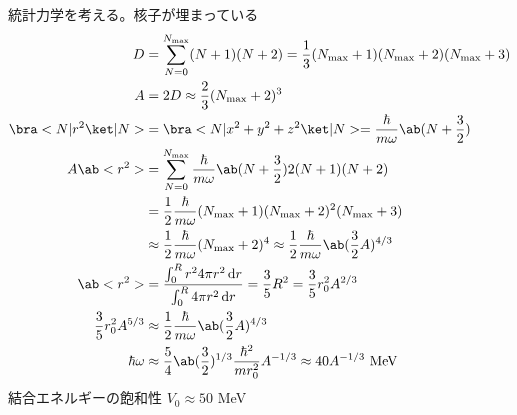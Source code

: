 \documentclass[uplatex,dvipdfmx,a4paper,11pt]{jlreq}
\numberwithin{equation}{section}
\theoremstyle{definition}
\begin{document}
統計力学を考える。核子が埋まっている
\begin{align}
  D                       & = \sum_{N = 0}^{N_{\max}}(N + 1)(N + 2) = \frac{1}{3}(N_{\max} + 1)(N_{\max} + 2)(N_{\max} + 3)                         \\
  A                       & = 2D \approx \frac{2}{3}(N_{\max} + 2)^3                                                                                \\
  \bra<N|r^2\ket|N>       & = \bra<N|x^2 + y^2 + z^2\ket|N> = \frac{\hbar}{m\omega}\ab(N + \frac{3}{2})                                             \\
  A\ab<r^2>               & = \sum_{N = 0}^{N_{\max}}\frac{\hbar}{m\omega}\ab(N + \frac{3}{2})2(N + 1)(N + 2)                                       \\
                          & = \frac{1}{2}\frac{\hbar}{m\omega}(N_{\max} + 1)(N_{\max} + 2)^2(N_{\max} + 3)                                          \\
                          & \approx\frac{1}{2}\frac{\hbar}{m\omega}(N_{\max} + 2)^4 \approx \frac{1}{2}\frac{\hbar}{m\omega}\ab(\frac{3}{2}A)^{4/3} \\
  \ab<r^2>                & = \frac{\int_0^Rr^24\pi r^2\dl{r}}{\int_0^R4\pi r^2\dl{r}} = \frac{3}{5}R^2 = \frac{3}{5}r_0^2A^{2/3}                   \\
  \frac{3}{5}r_0^2A^{5/3} & \approx \frac{1}{2}\frac{\hbar}{m\omega}\ab(\frac{3}{2}A)^{4/3}                                                         \\
  \hbar\omega             & \approx \frac{5}{4}\ab(\frac{3}{2})^{1/3}\frac{\hbar^2}{mr_0^2}A^{-1/3} \approx 40A^{-1/3}\ \si{MeV}
\end{align}
結合エネルギーの飽和性 $V_0 \approx 50$ \si{MeV}
\end{document}
